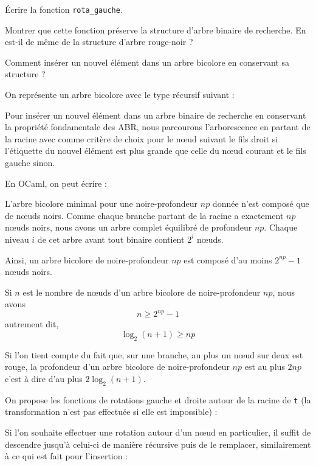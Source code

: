 Écrire la fonction \texttt{rota\_gauche}.
\smallskip

Montrer que cette fonction préserve la structure d'arbre binaire de recherche. En est-il de même de la structure d'arbre rouge-noir ?

\Q
Comment insérer un nouvel élément dans un arbre bicolore en conservant sa structure ?

\Corrige

\Q
On représente un arbre bicolore avec le type récursif suivant :



\Q
Pour insérer un nouvel élément dans un arbre binaire de recherche en conservant la propriété fondamentale des ABR, nous parcourons l'arborescence en partant de la racine avec comme critère de choix pour le nœud suivant le fils droit si l'étiquette du nouvel élément est plus grande que celle du nœud courant et le fils gauche sinon.
\medskip

En OCaml, on peut écrire :



\Q
L'arbre bicolore minimal pour une noire-profondeur $np$ donnée n'est composé que de nœuds noirs. Comme chaque branche partant de la racine a exactement $np$ nœuds noirs, nous avons un arbre complet équilibré de profondeur $np$. Chaque niveau $i$ de cet arbre avant tout binaire contient $2^i$ nœuds.
\medskip

Ainsi, un arbre bicolore de noire-profondeur $np$ est composé d'au moins $2^{np}-1$ nœuds noirs.
\medskip

Si $n$ est le nombre de nœuds d'un arbre bicolore de noire-profondeur $np$, nous avons
\[
    n \geq 2^{np}-1
\]
autrement dit,
\[
    \log_2(n+1) \geq np
\]

Si l'on tient compte du fait que, sur une branche, au plus un nœud sur deux est rouge, la profondeur d'un arbre bicolore de noire-profondeur $np$ est au plus $2np$ c'est à dire d'au plus $2\log_2(n+1)$.

\Q
On propose les fonctions de rotations gauche et droite autour de la racine de \texttt{t} (la transformation n'est pas effectuée si elle est impossible) :



Si l'on souhaite effectuer une rotation autour d'un nœud en particulier, il suffit de descendre jusqu'à celui-ci de manière récursive puis de le remplacer, similairement à ce qui est fait pour l'insertion :

